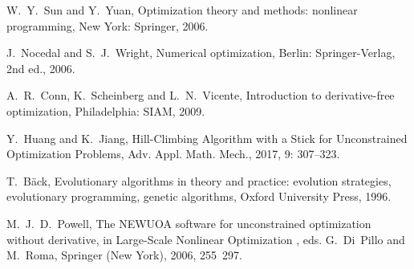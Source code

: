 \documentclass[final,1p,times]{elsarticle}
\begin{document}
\begin{thebibliography}{99}

W.~Y.~Sun and Y.~Yuan,
Optimization theory and methods: nonlinear programming,
New York: Springer, 2006.


J.~Nocedal and S.~J.~Wright,
Numerical optimization, 
Berlin: Springer-Verlag, 2nd ed., 2006.

A.~R.~Conn, K.~Scheinberg and L.~N.~Vicente,
Introduction to derivative-free optimization,
Philadelphia: SIAM, 2009.

{Y.~Huang and K.~Jiang,}
{Hill-Climbing Algorithm with a Stick for Unconstrained Optimization Problems},
{Adv. Appl. Math. Mech.},
2017, 9: 307--323.

T.~B{\"a}ck, 
Evolutionary algorithms in theory and practice: evolution
  strategies, evolutionary programming, genetic algorithms,
Oxford University Press, 1996.

M.~J.~D.~Powell,
The NEWUOA software for unconstrained optimization without derivative, in
Large-Scale Nonlinear Optimization , eds. G.~Di~Pillo
and M.~Roma, Springer (New York), 2006, 255~297.



\end{thebibliography}
\end{document}
